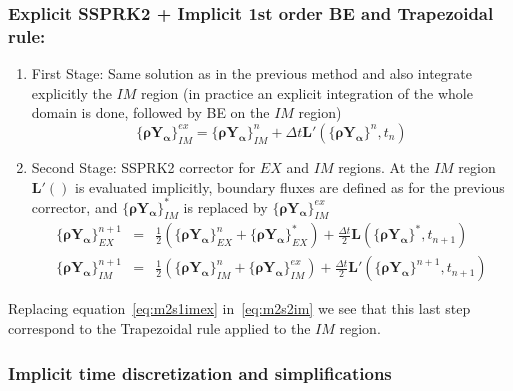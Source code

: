\documentclass[12pt]{article}
\begin{document}
\subsubsection*{Explicit SSPRK2 + Implicit 1st order BE and Trapezoidal rule:}
%
\begin{enumerate}
   \item First Stage: Same solution as in the previous method and also integrate explicitly the $IM$ region (in practice an explicit integration of the whole domain is done, followed by BE on the $IM$ region)
   \begin{equation}
     \{\mathbf{\rho Y_\alpha}\}^{ex}_{IM} = \{\mathbf{\rho Y_\alpha}\}^{n}_{IM}+\Delta t \mathbf{L}'(\{\mathbf{\rho Y_\alpha}\}^n,t_n) \label{eq:m2s1imex}
   \end{equation}

  \item Second Stage: SSPRK2 corrector for $EX$ and $IM$ regions. At the $IM$ region $\mathbf{L}'()$ is evaluated implicitly, boundary fluxes are defined as for the previous corrector, and $\{\mathbf{\rho Y_\alpha}\}^{*}_{IM}$ is replaced by $\{\mathbf{\rho Y_\alpha}\}^{ex}_{IM}$
   \begin{eqnarray}
   \{\mathbf{\rho Y_\alpha}\}^{n+1}_{EX}&=& \frac{1}{2}\left( \{\mathbf{\rho Y_\alpha}\}^{n}_{EX} + 
                                                                                              \{\mathbf{\rho Y_\alpha}\}^*_{EX} \right) + 
                                                   \frac{\Delta t}{2} \mathbf{L}(\{\mathbf{\rho Y_\alpha}\}^*,t_{n+1})  \label{eq:m2s2ex} \\
   \{\mathbf{\rho Y_\alpha}\}^{n+1}_{IM}&=& \frac{1}{2}\left( \{\mathbf{\rho Y_\alpha}\}^{n}_{IM} + 
                                                                                             \{\mathbf{\rho Y_\alpha}\}^{ex}_{IM} \right) +
                                                   \frac{\Delta t}{2} \mathbf{L}'(\{\mathbf{\rho Y_\alpha}\}^{n+1},t_{n+1}) \label{eq:m2s2im}
   \end{eqnarray}     
\end{enumerate}
%
Replacing equation~\eqref{eq:m2s1imex} in~\eqref{eq:m2s2im} we see that this last step correspond to the Trapezoidal rule applied to the $IM$ region. 


\subsubsection{Implicit time discretization and simplifications}
\end{document}
